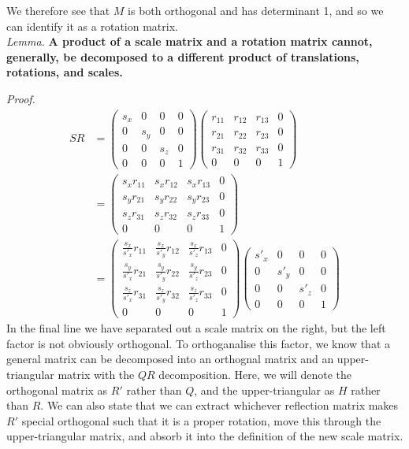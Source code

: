\documentclass{article}
\begin{document}
We therefore see that $M$ is both orthogonal and has determinant 1, and so we can identify it as a rotation matrix.\\

\noindent
\textit{Lemma.}\textbf{ A product of a scale matrix and a rotation matrix cannot, generally, be decomposed to a different product of translations, rotations, and scales.}

\noindent\textit{Proof.}
\begin{align}
S R &= \begin{pmatrix}
s_x & 0 & 0 & 0\\
0 & s_y & 0 & 0\\
0 & 0 & s_z & 0\\
0 & 0 & 0 & 1
\end{pmatrix}
\begin{pmatrix}
r_{11} & r_{12} & r_{13} & 0\\
r_{21} & r_{22} & r_{23} & 0\\
r_{31} & r_{32} & r_{33} & 0\\
0 & 0 & 0 & 1
\end{pmatrix}\\
&= \begin{pmatrix}
s_x r_{11} & s_x r_{12} & s_x r_{13} & 0\\
s_y r_{21} & s_y r_{22} & s_y r_{23} & 0\\
s_z r_{31} & s_z r_{32} & s_z r_{33} & 0\\
0 & 0 & 0 & 1
\end{pmatrix}\\
&= \begin{pmatrix}
\frac{s_x}{s'_x} r_{11} & \frac{s_x}{s'_y} r_{12} & \frac{s_x}{s'_z} r_{13} & 0\\
\frac{s_y}{s'_x} r_{21} & \frac{s_y}{s'_y} r_{22} & \frac{s_y}{s'_z} r_{23} & 0\\
\frac{s_z}{s'_x} r_{31} & \frac{s_z}{s'_y} r_{32} & \frac{s_z}{s'_z} r_{33} & 0\\
0 & 0 & 0 & 1
\end{pmatrix}
\begin{pmatrix}
s'_x & 0 & 0 & 0\\
0 & s'_y & 0 & 0\\
0 & 0 & s'_z & 0\\
0 & 0 & 0 & 1
\end{pmatrix}
\end{align}
In the final line we have separated out a scale matrix on the right, but the left factor is not obviously orthogonal. To orthoganalise this factor, we know that a general matrix can be decomposed into an orthognal matrix and an upper-triangular matrix with the $QR$ decomposition. Here, we will denote the orthogonal matrix as $R'$ rather than $Q$, and the upper-triangular as $H$ rather than $R$. We can also state that we can extract whichever reflection matrix makes $R'$ special orthogonal such that it is a proper rotation, move this through the upper-triangular matrix, and absorb it into the definition of the new scale matrix.
\end{document}
